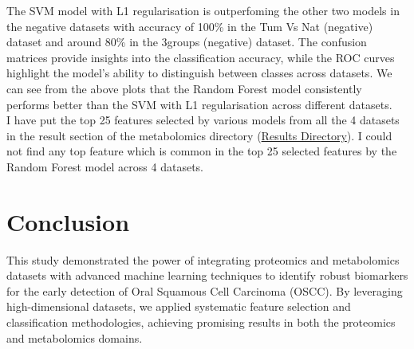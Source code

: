 \documentclass[a4paper,12pt]{article}
\begin{document}
The SVM model with L1 regularisation is outperfoming the other two models in the negative datasets with accuracy of 100\% in the Tum Vs Nat (negative) dataset and around 80\% in the 3groups (negative) dataset.
The confusion matrices provide insights into the classification accuracy, while the ROC curves highlight the model's ability to distinguish between classes across datasets. We can see from the above plots that the Random Forest model consistently performs better than the SVM with L1 regularisation across different datasets.\\
I have put the top 25 features selected by various models from all the 4 datasets in the result section of the metabolomics directory (\href{run:./metabolomics/results}{Results Directory}). I could not find any top feature which is common in the top 25 selected features by the Random Forest model across 4 datasets.

\section{Conclusion}
This study demonstrated the power of integrating proteomics and metabolomics datasets with advanced machine learning techniques to identify robust biomarkers for the early detection of Oral Squamous Cell Carcinoma (OSCC). By leveraging high-dimensional datasets, we applied systematic feature selection and classification methodologies, achieving promising results in both the proteomics and metabolomics domains.
\end{document}
